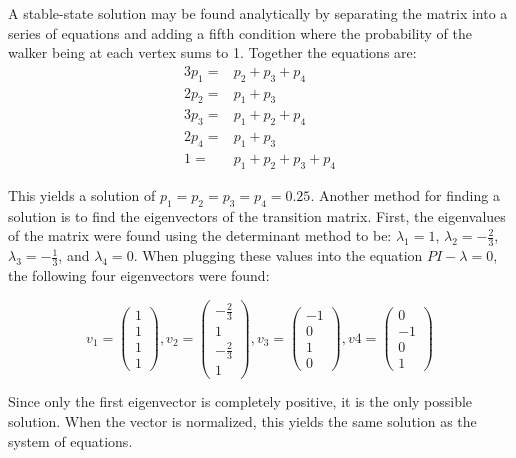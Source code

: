 \documentclass[twocolumn]{article}
\begin{document}
A stable-state solution may be found analytically by separating the matrix into a series of equations and adding a fifth condition where the probability of the walker being at each vertex sums to 1. Together the equations are:
\begin{equation}
\begin{split}
3p_1 =& p_2 + p_3 + p_4 \\
2p_2 =& p_1 + p_3 \\
3p_3 =& p_1 + p_2 + p_4 \\
2p_4 =& p_1 + p_3 \\
1 =& p_1 + p_2 + p_3 + p_4
\end{split}
\end{equation}

This yields a solution of $p_1 = p_2 = p_3 = p_4 = 0.25$. Another method for finding a solution is to find the eigenvectors of the transition matrix. First, the eigenvalues of the matrix were found using the determinant method to be: $\lambda_1 = 1$, $\lambda_2 = -\frac{2}{3}$, $\lambda_3 = -\frac{1}{3}$, and $\lambda_4 = 0$. When plugging these values into the equation $PI-\lambda=0$, the following four eigenvectors were found:

\[
v_1 = \begin{pmatrix}1 \\ 1 \\ 1 \\ 1\end{pmatrix}, v_2= \begin{pmatrix}-\frac{2}{3} \\ 1 \\ -\frac{2}{3} \\ 1\end{pmatrix}, v_3= \begin{pmatrix}-1 \\ 0 \\ 1 \\ 0\end{pmatrix}, v4 = \begin{pmatrix}0 \\ -1 \\ 0 \\ 1\end{pmatrix}
\]

Since only the first eigenvector is completely positive, it is the only possible solution. When the vector is normalized, this yields the same solution as the system of equations. 

\end{document}
